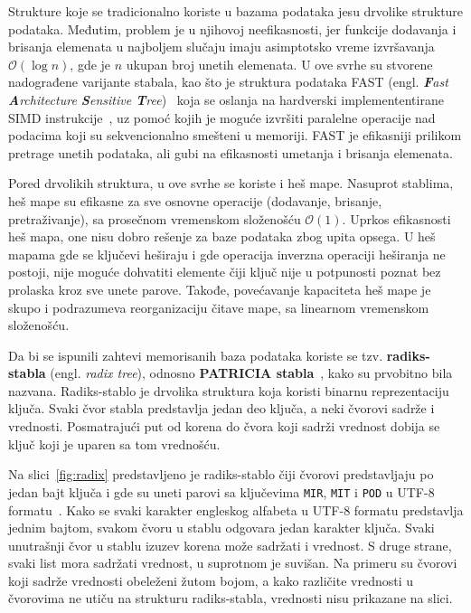 \documentclass[12pt,oneside]{memoir}
\begin{document}
Strukture koje se tradicionalno koriste u bazama podataka jesu
drvolike strukture podataka. Međutim, problem je u njihovoj neefikasnosti, jer
funkcije dodavanja i brisanja elemenata u najboljem slučaju imaju asimptotsko vreme izvršavanja
$ \mathcal{O}(\log{}n) $, gde je $n$ ukupan broj unetih elemenata.
U ove svrhe su stvorene nadograđene varijante stabala,
kao što je struktura podataka FAST
(engl. \emph{\textbf{F}ast \textbf{A}rchitecture \textbf{S}ensitive \textbf{T}ree})~\cite{fast}
koja se oslanja na hardverski implemententirane SIMD instrukcije~\cite{simd},
uz pomoć kojih je moguće izvršiti paralelne operacije nad podacima koji su
sekvencionalno smešteni u memoriji.
FAST je efikasniji prilikom pretrage unetih podataka,
ali gubi na efikasnosti umetanja i brisanja elemenata.

Pored drvolikih struktura, u ove svrhe se koriste i heš mape. Nasuprot
stablima, heš mape su efikasne za sve osnovne operacije (dodavanje, brisanje, pretraživanje),
sa prosečnom vremenskom složenošću $ \mathcal{O}(1) $. Uprkos efikasnosti heš mapa, one nisu
dobro rešenje za baze podataka zbog upita opsega. U heš mapama gde se ključevi heširaju
i gde operacija inverzna operaciji heširanja ne postoji, nije moguće dohvatiti
elemente čiji ključ nije u potpunosti poznat bez prolaska kroz sve unete parove.
Takođe, povećavanje kapaciteta heš mape je skupo i podrazumeva reorganizaciju
čitave mape, sa linearnom vremenskom složenošću.

Da bi se ispunili zahtevi memorisanih baza podataka koriste se tzv.
\textbf{radiks-stabla} (engl. \emph{radix tree}), odnosno
\textbf{PATRICIA stabla}~\cite{patricia}, kako su prvobitno bila nazvana.
Radiks-stablo je drvolika struktura koja koristi binarnu reprezentaciju ključa.
Svaki čvor stabla predstavlja jedan deo ključa, a neki čvorovi
sadrže i vrednosti. Posmatrajući put od korena do čvora koji
sadrži vrednost dobija se ključ koji je uparen sa tom
vrednošću.

Na slici~\ref{fig:radix} predstavljeno je radiks-stablo
čiji čvorovi predstavljaju po jedan bajt ključa i gde su uneti parovi sa
ključevima \texttt{MIR}, \texttt{MIT} i \texttt{POD} u
UTF-8 formatu~\cite{unicode}.
Kako se svaki karakter engleskog alfabeta u UTF-8 formatu predstavlja
jednim bajtom, svakom čvoru u stablu odgovara jedan karakter
ključa. Svaki unutrašnji čvor u stablu izuzev korena može sadržati i vrednost.
S druge strane, svaki list mora sadržati vrednost, u suprotnom je suvišan.
Na primeru su čvorovi koji sadrže vrednosti obeleženi žutom bojom,
a kako različite vrednosti u čvorovima ne utiču na strukturu
radiks-stabla, vrednosti nisu prikazane na slici.
\end{document}
